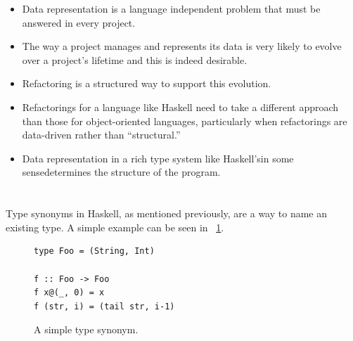 \begin{itemize}
	\item Data representation is a language independent problem that must be answered in every project.
	\item The way a project manages and represents its data is very likely to evolve over a project's lifetime and this is indeed desirable.
	\item Refactoring is a structured way to support this evolution.
		\item Refactorings for a language like Haskell need to take a different approach than those for object-oriented languages, particularly when refactorings are data-driven rather than ``structural.''  
	\item Data representation in a rich type system like Haskell's\DIFaddbegin \DIFadd{, }\DIFaddend in some sense\DIFaddbegin \DIFadd{, }\DIFaddend determines the structure of the program.
\end{itemize} 

\DIFdelbegin \subsection{}%
\addtocounter{subsection}{-1}%
\DIFdelend \DIFaddbegin \section{}\DIFaddend \label{introSyn}

Type synonyms in Haskell, as mentioned previously, are a way to name an existing type. A simple example can be seen in \DIFdelbegin {}\DIFdelend \DIFaddbegin {}\DIFaddend ~\ref{fooSyn}. 

\begin{figure}[t]
	\DIFdelbeginFL %

\DIFdelendFL \DIFaddbeginFL \begin{lstlisting}
type Foo = (String, Int)

f :: Foo -> Foo
f x@(_, 0) = x
f (str, i) = (tail str, i-1) 
	\end{lstlisting}
	\DIFaddendFL \caption{A simple type synonym.}\DIFaddbeginFL \label{fooSyn}
\DIFaddendFL \end{figure}

